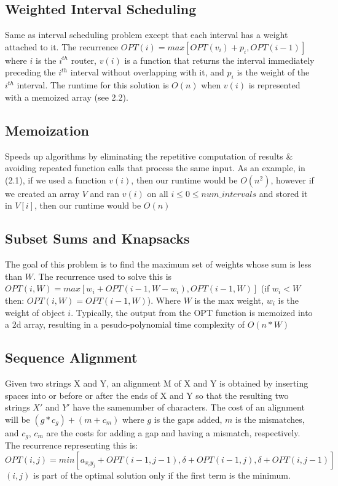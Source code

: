 \documentclass{article}
\begin{document}
\subsection{Weighted Interval Scheduling}
Same as interval scheduling problem except that each interval has a weight attached to it. 
The recurrence $OPT(i) = max[OPT(v_i) + p_i, OPT(i - 1)]$ where $i$ is the $i^{th}$ router, $v(i)$
is a function that returns the interval immediately preceding the $i^{th}$ interval without overlapping with it, 
and $p_i$ is the weight of the $i^{th}$ interval. The runtime for this solution is $O(n)$ when $v(i)$ is 
represented with a memoized array (see 2.2).

\subsection{Memoization}
Speeds up algorithms by eliminating the repetitive computation of results \& avoiding repeated function calls that process the same input.
As an example, in (2.1), if we used a function $v(i)$, then our runtime would be $O(n^2)$, however if we created an array $V$ and ran $v(i)$
on all $i \leq 0 \leq num\_intervals$  and stored it in $V[i]$, then our runtime would be $O(n)$

\subsection{Subset Sums and Knapsacks}
The goal of this problem is to find the maximum set of weights whose sum is less than $W$.
The recurrence used to solve this is $OPT(i, W) = max[w_i + OPT(i - 1, W - w_i), OPT(i-1, W)]$ (if $w_i < W$ then: $OPT(i, W) = OPT(i-1, W)$).
Where $W$ is the max weight, $w_i$ is the weight of object $i$. Typically, the output from the OPT 
function is memoized into a 2d array, resulting in a pesudo-polynomial time complexity of $O(n * W)$

\subsection{Sequence Alignment}
Given two strings X and Y, an alignment M of X and Y is obtained by inserting spaces into or
before or after the ends of X and Y so that the resulting two strings $X'$ and $Y'$  have the samenumber of characters.
The cost of an alignment will be $(g * c_g) + (m + c_m)$ where $g$ is the gaps added, $m$ is the mismatches, and $c_g$, $c_m$
are the costs for adding a gap and having a mismatch, respectively.
The recurrence representing this is: $OPT(i, j) = min[a_{x_iy_j} + OPT(i - 1, j - 1),\delta + OPT(i - 1, j), \delta + OPT(i, j - 1)]$ \\ 
$(i,j)$ is part of the optimal solution only if the first term is the minimum.
\end{document}
